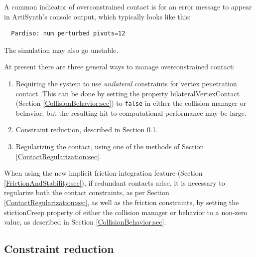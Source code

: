 A common indicator of overconstrained contact is for an error message
to appear in ArtiSynth's console output, which typically looks like
this:
%
\begin{verbatim}
  Pardiso: num perturbed pivots=12
\end{verbatim}
%
The simulation may also go unstable.

At present there are three general ways to manage overconstrained
contact: 

\begin{enumerate}

\item Requiring the system to use {\it unilateral} constraints for
vertex penetration contact. This can be done by setting the
property {\sf bilateralVertexContact} (Section
\ref{CollisionBehavior:sec}) to {\tt false} in either the collision
manager or behavior, but the resulting hit to computational
performance may be large.

\item Constraint reduction, described in Section
\ref{ConstraintReduction:sec}.

\item Regularizing the contact, using one of the methods
of Section \ref{ContactRegularization:sec}.

\end{enumerate}

\begin{sideblock}
When using the new implicit friction integration feature (Section
\ref{FrictionAndStability:sec}), if redundant contacts arise, it is
necessary to regularize both the contact constraints, as per Section
\ref{ContactRegularization:sec}, as well as the friction constraints,
by setting the {\sf stictionCreep} property of either the collision
manager or behavior to a non-zero value, as described in Section
\ref{CollisionBehavior:sec}.
\end{sideblock}

\subsection{Constraint reduction}
\label{ConstraintReduction:sec}

